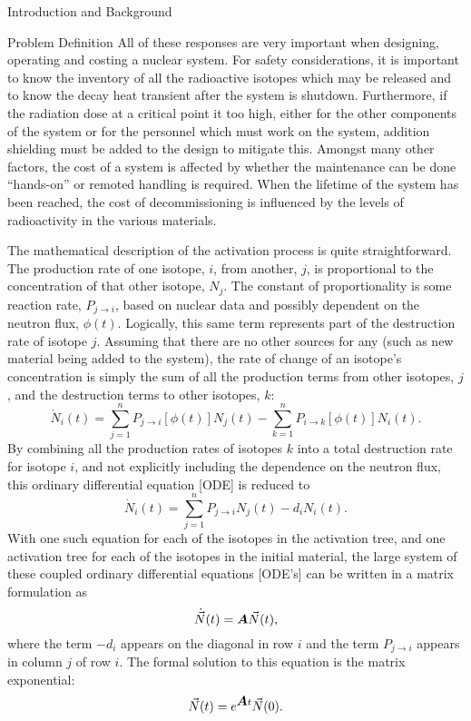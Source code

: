 \begin{chapter}{Introduction and Background}
\begin{section}{Problem Definition\label{sec:intro.prob_def}}
  All of these responses are very important when designing, operating
  and costing a nuclear system.  For safety considerations, it is
  important to know the inventory of all the radioactive isotopes
  which may be released and to know the decay heat transient after the
  system is shutdown.  Furthermore, if the radiation dose at a
  critical point it too high, either for the other components of the
  system or for the personnel which must work on the system, addition
  shielding must be added to the design to mitigate this.  Amongst
  many other factors, the cost of a system is affected by whether the
  maintenance can be done ``hands-on'' or remoted handling is
  required.  When the lifetime of the system has been reached, the
  cost of decommissioning is influenced by the levels of radioactivity
  in the various materials.
  
  The mathematical description of the activation process is quite
  straightforward.  The production rate of one isotope, $i$, from
  another, $j$, is proportional to the concentration of that other
  isotope, $N_j$.  The constant of proportionality is some reaction
  rate, $P_{j\rightarrow i}$, based on nuclear data and possibly
  dependent on the neutron flux, $\phi(t)$.  Logically, this same term
  represents part of the destruction rate of isotope $j$.  Assuming
  that there are no other sources for any (such as new material being
  added to the system), the rate of change of an isotope's
  concentration is simply the sum of all the production terms from
  other isotopes, $j$, and the destruction terms to other isotopes,
  $k$:
  \begin{equation*}
    \dot{N}_i(t) = \sum_{j=1}^n P_{j\rightarrow
      i}\left[\phi(t)\right]N_j(t) - \sum_{k=1}^n P_{i \rightarrow
      k}\left[\phi(t)\right]N_i(t).
  \end{equation*}
  By combining all the production
  rates of isotopes $k$ into a total destruction rate for isotope $i$,
  and not explicitly including the dependence on the neutron flux,
  this ordinary differential equation [ODE] is reduced to
  \begin{equation*}
    \dot{N}_i(t) = \sum_{j=1}^n P_{j\rightarrow i}N_j(t) - d_i
    N_i(t).
  \end{equation*}
  With one such equation for each of the isotopes in the activation
  tree, and one activation tree for each of the isotopes in the
  initial material, the large system of these coupled ordinary
  differential equations [ODE's] can be written in a matrix
  formulation as
  \begin{equation}
    \dot{\vec{N}}(t) = \mbox{\boldmath $A$}\vec{N}(t),\label{eqn:intro.basic_ode}
  \end{equation}
  where the term $-d_i$
  appears on the diagonal in row $i$ and the term $P_{j \rightarrow
    i}$ appears in column $j$ of row $i$.  The formal solution to this
  equation is the matrix exponential:
  \begin{equation}
    \vec{N}(t) = e^{\mbox{\boldmath $A$}t}\vec{N}(0).\label{eqn:intro.basic_soln}
  \end{equation}


\end{section}
\end{chapter}
